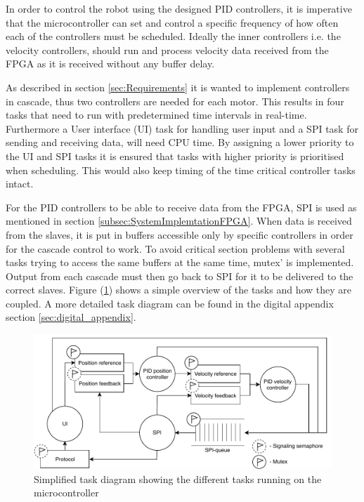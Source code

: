 \documentclass[../../main.tex]{subfiles}
\begin{document}
In order to control the robot using the designed PID controllers, it is imperative that the microcontroller can set and control a specific frequency of how often each of the controllers must be scheduled. Ideally the inner controllers i.e. the velocity controllers, should run and process velocity data received from the FPGA as it is received without any buffer delay. 

As described in section \ref{sec:Requirements} it is wanted to implement controllers in cascade, thus two controllers are needed for each motor. This results in four tasks that need to run with predetermined time intervals in real-time. Furthermore a User interface (UI) task for handling user input and a SPI task for sending and receiving data, will need CPU time. By assigning a lower priority to the UI and SPI tasks it is ensured that tasks with higher priority is prioritised when scheduling. This would also keep timing of the time critical controller tasks intact. 

For the PID controllers to be able to receive data from the FPGA, SPI is used as mentioned in section \ref{subsec:SystemImplemtationFPGA}. When data is received from the slaves, it is put in buffers accessible only by specific controllers in order for the cascade control to work. To avoid critical section problems with several tasks trying to access the same buffers at the same time, mutex' is implemented. Output from each cascade must then go back to SPI for it to be delivered to the correct slaves. Figure (\ref{fig:OverviewTaskDiagramSimple}) shows a simple overview of the tasks and how they are coupled. A more detailed task diagram can be found in the digital appendix section \ref{sec:digital_appendix}.

\begin{figure}[H]
    \centering
    \includegraphics[width=\textwidth]{Sections/System_Implementation/Images/OverviewTaskDiagramSimple.pdf}
    \caption{Simplified task diagram showing the different tasks running on the microcontroller}
    \label{fig:OverviewTaskDiagramSimple}
\end{figure}
\end{document}
